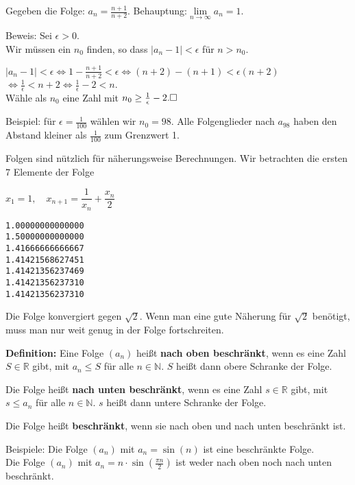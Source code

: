 \begin{frame}[fragile]
Gegeben die Folge: $a_n = \frac{n+1}{n+2}$. \quad Behauptung:$\lim \limits_{n \to \infty} a_n = 1$. \pause

Beweis: Sei $\epsilon > 0$. \\ \pause
Wir müssen ein $n_0$ finden, so dass $ \vert a_n - 1 \vert < \epsilon$ für $n > n_0$. \pause

$ \vert a_n - 1  \vert < \epsilon \Leftrightarrow 1 - \frac{n+1}{n+2} < \epsilon \Leftrightarrow (n+2)-(n+1) < \epsilon (n+2)$
$ \Leftrightarrow \frac{1}{\epsilon} < n+2 \Leftrightarrow \frac{1}{\epsilon} - 2 < n .$ \\ \pause
Wähle als $n_0$ eine Zahl mit $n_0 \ge \frac{1}{\epsilon} - 2. \hfill \square$ \pause


Beispiel: für $\epsilon = \frac{1}{100}$ wählen wir $n_0 = 98$. Alle Folgenglieder nach $a_{98}$ haben den Abstand kleiner als $\frac{1}{100}$ zum Grenzwert 1.

\end{frame}

\begin{frame}[fragile]
Folgen sind nützlich für näherungsweise Berechnungen. \pause  Wir betrachten die ersten 7 Elemente der Folge

$x_1= 1, \quad x_{n+1} = \dfrac{1}{x_n} + \dfrac{x_n}{2}$

\begin{lstlisting} 
1.00000000000000
1.50000000000000
1.41666666666667
1.41421568627451
1.41421356237469
1.41421356237310
1.41421356237310
\end{lstlisting} \pause

Die Folge konvergiert gegen $\sqrt{2}$. \pause Wenn man eine gute Näherung für $\sqrt{2}$ benötigt, muss man nur weit genug in der Folge fortschreiten.
\end{frame}


\begin{frame}[fragile]
\textbf{Definition:} Eine Folge $(a_n)$ heißt \textbf{nach oben beschränkt}, wenn es eine Zahl $S \in \mathbb{R}$ gibt, mit 
$a_n  \le S$ für alle $n \in \mathbb{N}$. $S$ heißt dann obere Schranke der Folge. \pause

 Die Folge heißt \textbf{nach unten beschränkt}, wenn es eine Zahl $s \in \mathbb{R}$ gibt, mit 
$s \le a_n$ für alle $n \in \mathbb{N}$. $s$ heißt dann untere Schranke der Folge. \pause

Die Folge heißt \textbf{beschränkt}, wenn sie nach oben und nach unten beschränkt ist. \pause


Beispiele: Die Folge $(a_n)$ mit $a_n = \sin(n)$ \pause ist eine beschränkte Folge. \\
Die Folge $(a_n)$ mit $a_n = n \cdot \sin(\frac{\pi  n}{2})$ \pause ist weder nach oben noch nach unten beschränkt.
\end{frame}

